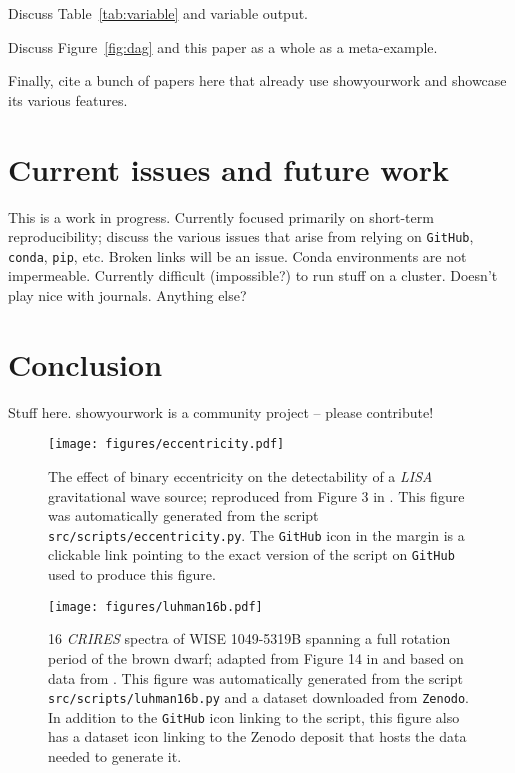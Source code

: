 \documentclass[modern]{aastex631}
\newcommand\xxx[1]{{\color{red}#1}}
\begin{document}
\xxx{Discuss Table~\ref{tab:variable} and variable output.}

\xxx{Discuss Figure~\ref{fig:dag} and this paper as a whole as a meta-example.}

\xxx{Finally, cite a bunch of papers here that already use showyourwork and showcase its various features.}

\section{Current issues and future work}
\label{sec:future}
\xxx{This is a work in progress. Currently focused primarily on short-term reproducibility; discuss the various issues that arise from relying on \texttt{GitHub}, \texttt{conda}, \texttt{pip}, etc. Broken links will be an issue. Conda environments are not impermeable. Currently difficult (impossible?) to run stuff on a cluster. Doesn't play nice with journals. Anything  else?}

\section{Conclusion}
\label{sec:conclusion}
\xxx{Stuff here. showyourwork is a community project -- please contribute!}

\clearpage

\begin{figure}[p!]
    \begin{centering}
        \texttt{[image: figures/eccentricity.pdf]}
        \caption{
            The effect of binary eccentricity on the detectability of a \emph{LISA} gravitational wave source; reproduced from Figure 3 in \citet{Wagg2022}. 
            This figure was automatically generated from the script \texttt{src/scripts/eccentricity.py}.
            The \texttt{GitHub} icon in the margin is a clickable link pointing to the exact version of the script on \texttt{GitHub} used to produce this figure.
        }
        \label{fig:eccentricity}
    \end{centering}
\end{figure}

\begin{figure}[p!]
    \begin{centering}
        \texttt{[image: figures/luhman16b.pdf]}
        \caption{
            16 \emph{CRIRES} spectra of WISE 1049-5319B spanning a full rotation period of the brown dwarf; adapted from Figure 14 in \citet{Luger2021c} and based on data from \citet{Crossfield2014}.
            This figure was automatically generated from the script \texttt{src/scripts/luhman16b.py} and a dataset downloaded from \texttt{Zenodo}.
            In addition to the \texttt{GitHub} icon linking to the script, this figure also has a dataset icon linking to the Zenodo deposit that hosts the data needed to generate it.
        }
        \label{fig:luhman16b}
    \end{centering}
\end{figure}
\end{document}
